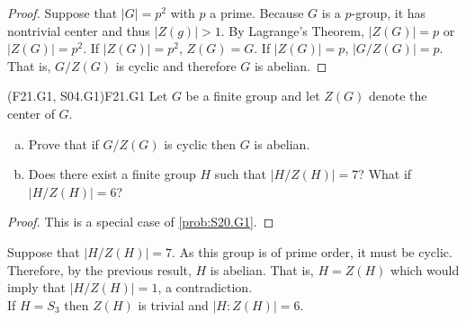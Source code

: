 \documentclass[../AlgebraQualSolutions.tex]{subfiles}
\begin{document}
	\begin{proof}
	Suppose that $|G| = p^2$ with $p$ a prime. Because $G$ is a $p$-group, it has nontrivial center and thus $|Z(g)| > 1$. By Lagrange's Theorem, $|Z(G)| = p$ or $|Z(G)| = p^2$. If $|Z(G)| =p^2$, $Z(G) = G$. If $|Z(G)| = p$, $\left|G/Z(G) \right| = p$. That is, $G/Z(G)$ is cyclic and therefore $G$ is abelian.
	\end{proof}
	
	\begin{prob}{(F21.G1, S04.G1)}{F21.G1}
	Let $G$ be a finite group and let $Z(G)$ denote the center of $G$.
	\begin{enumerate}[(a)]
	\item Prove that if $G/Z(G)$ is cyclic then $G$ is abelian.
	\item Does there exist a finite group $H$ such that $|H/Z(H)| = 7$? What if $|H/Z(H)| = 6$?
	\end{enumerate}
	\end{prob}
	
	\begin{proof}
	This is a special case of \ref{prob:S20.G1}.
	\end{proof}
	
	\begin{solution}
	Suppose that $|H/Z(H)| = 7$. As this group is of prime order, it must be cyclic. Therefore, by the previous result, $H$ is abelian. That is, $H = Z(H)$ which would imply that $|H/Z(H)| = 1$, a contradiction.\\
	
	If $H = S_3$ then $Z(H)$ is trivial and $|H: Z(H)| = 6$.
	\end{solution}
\end{document}
